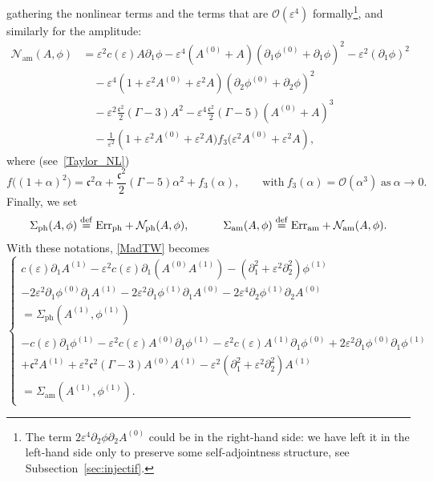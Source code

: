 \documentclass[AHL,Unicode,longabstracts,published]{cedram}
\newcommand*\p{\partial}
\newcommand*\ddef{\stackrel{\rm def}{=}}
\newcommand{\amm}{\mathrm{am}}
\newcommand{\phl}{\mathrm{ph}}
\newcommand{\Err}{\mathrm{Err}}
\newcommand*\BO{\mathcal{O}}
\newcommand*\BN{\mathcal{N}}
\newcommand*\cs{{\mathfrak c}}
\newcommand*\e{\varepsilon}
\renewcommand*\a{\alpha}
\begin{document}
gathering the nonlinear terms and the terms that are $ \BO(\e^4) $ formally\footnote{The term $ 2 \e^4 \p_2 \phi \p_2 A^{(0)} $ could be in the right-hand side: we have left it in the left-hand side only to preserve some self-adjointness structure, see Subsection~\ref{sec:injectif}.}, and similarly for the amplitude:
\begin{equation}\label{def:sourcephi}
\begin{split}
\BN_{\amm} (A, \phi)
& =\e^2 c (\e) A \p_1 \phi - \e^4 \left(A^{(0)} + A\right) \left(\p_{1} \phi^{(0)} + \p_1 \phi\right)^2 - \e^2 (\p_1 \phi)^2
\\ & \quad - \e^4 \left(1+ \e^2 A^{(0)} + \e^2 A\right) \left(\p_{2} \phi^{(0)} + \p_2 \phi\right)^2
\\ & \quad - \e^2 \frac{\cs^2}{2} (\Gamma-3) A^2 - \e^4 \frac{\cs^2}{2} (\Gamma-5) (A^{(0)} + A)^3
\\ & \quad - \frac{1}{\e^2} \left(1+ \e^2 A^{(0)} + \e^2 A) f_3(\e^2 A^{(0)} + \e^2 A\right),
\end{split}
\end{equation}
where (see~\eqref{Taylor_NL})
\[
f \big((1+ \a)^2 \big) = \cs^2 \a + \frac{\cs^2}{2} (\Gamma - 5) \a^2 + f_3(\a), \qquad \text{with} \ f_3(\a) = \BO(\a^3)
\; \text{as} \ \a \to 0.
\]
Finally, we set
\begin{align*}
\Sigma_{\phl} (A, \phi)
\ddef \Err_{\phl} + \BN_{\phl} (A, \phi),
\quad \quad \quad
\Sigma_{\amm} (A, \phi)
\ddef \Err_{\amm} + \BN_{\amm} (A, \phi).
\end{align*}
With these notations, \eqref{MadTW} becomes
\begin{equation}\label{MadTW_1}
\left\{
\begin{array}{ll}
c(\e) \p_{1} A^{(1)} - \e^2 c(\e) \p_1 \left(A^{(0)} A^{(1)}\right) - \left(\p_{1}^2 + \e^2 \p^2_{2}\right) \phi^{(1)}
\\[0.2em]
- 2 \e^2 \p_{1} \phi^{(0)} \p_{1} A^{(1)} - 2 \e^2 \p_{1} \phi^{(1)} \p_{1} A^{(0)} - 2 \e^4 \p_{2} \phi^{(1)} \p_{2} A^{(0)}
\\
= \Sigma_{\phl} \left(A^{(1)}, \phi^{(1)}\right)
\\ \ \\
- c(\e) \p_{1} \phi^{(1)} - \e^2 c(\e) A^{(0)} \p_{1} \phi^{(1)} - \e^2 c(\e) A^{(1)} \p_{1} \phi^{(0)} + 2 \e^2 \p_{1} \phi^{(0)} \p_{1} \phi^{(1)}
\\
+ \cs^2 A^{(1)} + \e^2 \cs^2 (\Gamma- 3) A^{(0)} A^{(1)} - \e^2 \left(\p_{1}^2 + \e^2 \p_{2}^2\right) A^{(1)}
\\ = \Sigma_{\amm} (A^{(1)}, \phi^{(1)}).
\end{array}\right.
\end{equation}
\end{document}
